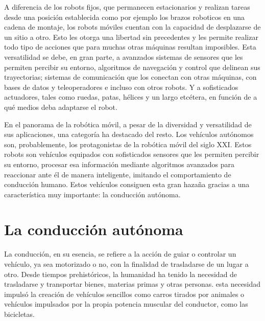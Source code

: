 A diferencia de los robots fijos, que permanecen estacionarios y realizan tareas desde una posición establecida como por ejemplo los brazos roboticos en una cadena de montaje, los robots móviles \cite{robots-moviles-2} cuentan con la capacidad de desplazarse de un sitio a otro. Esto les otorga una libertad sin precedentes y les permite realizar todo tipo de acciones que para muchas otras máquinas resultan imposibles. Esta versatilidad se debe, en gran parte, a avanzados sistemas de sensores que les permiten percibir su entorno, algoritmos de navegación y control que delinean sus trayectorias; sistemas de comunicación que los conectan con otras máquinas, con bases de datos y teleoperadores e incluso con otros robots. Y a sofisticados actuadores, tales como ruedas, patas, hélices y un largo etcétera, en función de a qué medios deba adaptarse el robot.

\bigskip

En el panorama de la robótica móvil, a pesar de la diversidad y versatilidad de sus aplicaciones, una categoría ha destacado del resto. Los vehículos autónomos son, probablemente, los protagonistas de la robótica móvil del siglo XXI. Estos robots son vehículos equipados con sofisticados sensores que les permiten percibir su entorno, procesar esa información mediante algoritmos avanzados para reaccionar ante él de manera inteligente, imitando el comportamiento de conducción humano. Estos vehículos consiguen esta gran hazaña gracias a una característica muy importante: la conducción autónoma.

\bigskip

\section{La conducción autónoma }
\label{sec:La_conducción_autónoma}

La conducción, en su esencia, se refiere a la acción de guiar o controlar un vehículo, ya sea motorizado o no, con la finalidad de trasladarse de un lugar a otro. Desde tiempos prehistóricos, la humanidad ha tenido la necesidad de trasladarse y transportar bienes, materias primas y otras personas. esta necesidad impulsó la creación de vehículos sencillos como carros tirados por animales o vehículos impulsados por la propia potencia muscular del conductor, como las bicicletas.

\bigskip

